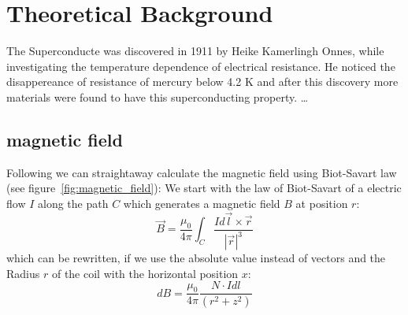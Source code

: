 \section{Theoretical Background}
The Superconducte was discovered in 1911 by Heike Kamerlingh Onnes, while
investigating the temperature dependence of electrical resistance.
He noticed the disappereance of resistance of mercury below 4.2 K and
after this discovery more materials were found to have this superconducting property.
\ldots






\subsection{magnetic field}
Following we can straightaway calculate the magnetic field using
Biot-Savart law (see figure~\ref{fig:magnetic_field}):
We start with the law of Biot-Savart of a electric flow $I$ along the path $C$ which generates
a magnetic field $B$ at position $r$:
\begin{equation}
    \vec{B} = \frac{\mu_0}{4\pi} \int_{C} \frac{I d\vec{l} \times \vec{r}}{|\vec{r}|^3} 
\end{equation}
which can be rewritten, if we use the absolute value instead of vectors and the Radius $r$ of the
coil with the horizontal position $x$:
\begin{equation}
    dB = \frac{\mu_0}{4\pi} \frac{N \cdot I dl}{(r^2 + z^2)} 
\end{equation}

